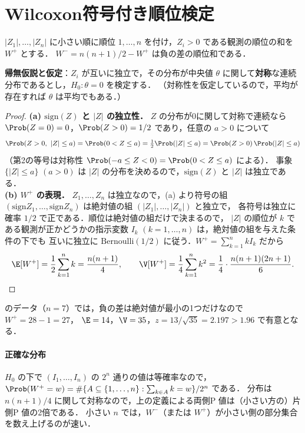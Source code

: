 \section{Wilcoxon符号付き順位検定}\label{sec:03-signrank}
\Hissu\Hinshutsu
\begin{teigi}[符号付き順位統計量]\label{def:03-wplus}
$|Z_1|,\dots,|Z_n|$ に小さい順に順位 $1,\dots,n$ を付け，$Z_i>0$ である観測の順位の和を $W^+$ とする．
$W^-=n(n+1)/2-W^+$ は負の差の順位和である．
\end{teigi}
\textbf{帰無仮説と仮定}：$Z_i$ が互いに独立で，その分布が中央値 $\theta$ に関して\textbf{対称}な連続分布であるとし，$H_0:\theta=0$ を検定する．
（対称性を仮定しているので，平均が存在すれば $\theta$ は平均でもある．）

\begin{proof}
\textbf{(a) $\mathrm{sign}(Z)$ と $|Z|$ の独立性．}
$Z$ の分布が0に関して対称で連続なら $\Prob(Z=0)=0$，$\Prob(Z>0)=1/2$ であり，任意の $a>0$ について
\[
\Prob(Z>0,\ |Z|\le a)=\Prob(0<Z\le a)=\tfrac12\Prob(|Z|\le a)=\Prob(Z>0)\,\Prob(|Z|\le a)
\]
（第2の等号は対称性 $\Prob(-a\le Z<0)=\Prob(0<Z\le a)$ による）．
事象 $\{|Z|\le a\}$ $(a>0)$ は $|Z|$ の分布を決めるので，$\mathrm{sign}(Z)$ と $|Z|$ は独立である．\\
\textbf{(b) $W^+$ の表現．}
$Z_1,\dots,Z_n$ は独立なので，(a) より符号の組 $(\mathrm{sign}Z_1,\dots,\mathrm{sign}Z_n)$ は絶対値の組 $(|Z_1|,\dots,|Z_n|)$ と独立で，
各符号は独立に確率 $1/2$ で正である．順位は絶対値の組だけで決まるので，
$|Z|$ の順位が $k$ である観測が正かどうかの指示変数 $I_k$ $(k=1,\dots,n)$ は，絶対値の組を与えた条件の下でも
互いに独立に $\mathrm{Bernoulli}(1/2)$ に従う．$W^+=\sum_{k=1}^n kI_k$ だから
\[
\E[W^+]=\frac12\sum_{k=1}^nk=\frac{n(n+1)}{4},\qquad
\V[W^+]=\frac14\sum_{k=1}^nk^2=\frac14\cdot\frac{n(n+1)(2n+1)}{6}.
\]
\end{proof}
 のデータ（$n=7$）では，負の差は絶対値が最小の1つだけなので $W^+=28-1=27$，
$\E=14$，$\V=35$，$z=13/\sqrt{35}=2.197>1.96$ で有意となる．

\paragraph{正確な分布}
$H_0$ の下で $(I_1,\dots,I_n)$ の $2^n$ 通りの値は等確率なので，
$\Prob(W^+=w)=\#\{A\subseteq\{1,\dots,n\}:\sum_{k\in A}k=w\}/2^n$ である．
分布は $n(n+1)/4$ に関して対称なので，上の定義による両側P 値は（小さい方の）片側P 値の2倍である．
小さい $n$ では，$W^-$（または $W^+$）が小さい側の部分集合を数え上げるのが速い．

